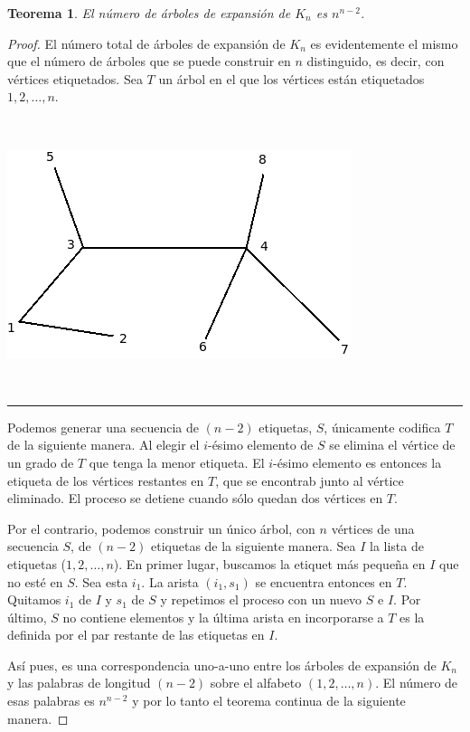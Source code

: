 \documentclass[10pt,a5paper]{book}
\newtheorem{teorema}{Teorema}[chapter]
\begin{document}
\begin{teorema}
El número de árboles de expansión de $K_n$ es $n^{n-2}$.
\end{teorema}
\begin{proof}
El número total de árboles de expansión de $K_n$ es evidentemente el mismo que el número de árboles que se puede construir en $n$ distinguido, es decir, con vértices etiquetados. Sea $T$ un árbol en el que los vértices están etiquetados $1,2, \ldots, n$.

\begin{figure}[H]
\caption{ }
\end{figure}
\hrulefill{}\\
\parbox{6cm}
{
\hspace*{.5in}\includegraphics[scale=.55]{Fig2_5.png}
}\hfill\\
\hrule

Podemos generar una secuencia de $(n-2)$ etiquetas, $S$, únicamente codifica $T$ de la siguiente manera. Al elegir el $i$-ésimo elemento de $S$ se elimina el vértice de un grado de $T$ que tenga la menor etiqueta. El $i$-ésimo elemento es entonces la etiqueta de los vértices restantes en $T$, que se encontrab junto al vértice eliminado. El proceso se detiene cuando sólo quedan dos vértices en $T$.

Por el contrario, podemos construir un único árbol, con $n$ vértices de una secuencia $S$, de $(n-2)$ etiquetas de la siguiente manera. Sea $I$ la lista de etiquetas ($1,2, \ldots,n$). En primer lugar, buscamos la etiquet más pequeña en $I$ que no esté en $S$. Sea esta $i_1$. La arista $(i_1,s_1)$ se encuentra entonces en $T$. Quitamos $i_1$ de $I$ y $s_1$ de $S$ y repetimos el proceso con un nuevo $S$ e $I$. Por último, $S$ no contiene elementos y la última arista en incorporarse a $T$ es la definida por el par restante de las etiquetas en $I$.

Así pues, es una correspondencia uno-a-uno entre los árboles de expansión de $K_n$ y las palabras de longitud $(n-2)$ sobre el alfabeto $(1,2, \ldots,n)$. El número de esas palabras es $n^{n-2}$ y por lo tanto el teorema continua de la siguiente manera.
\end{proof}
\end{document}
